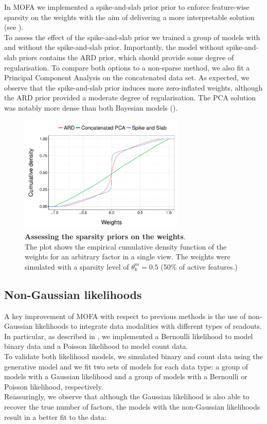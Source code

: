 In MOFA we implemented a spike-and-slab prior prior to enforce feature-wise sparsity on the weights with the aim of delivering a more interpretable solution (see ).\\
To assess the effect of the spike-and-slab prior we trained a group of models with and without the spike-and-slab prior. Importantly, the model without spike-and-slab priors contains the ARD prior, which should provide some degree of regularisation. To compare both options to a non-sparse method, we also fit a Principal Component Analysis on the concatenated data set. As expected, we observe that the spike-and-slab prior induces more zero-inflated weights, although the ARD prior provided a moderate degree of regularisation. The PCA solution was notably more dense than both Bayesian models ().

\begin{figure}[H]
	\centering 	
	\includegraphics[width=0.7\textwidth]{MOFA_sparsity}
	\caption{\textbf{Assessing the sparsity priors on the weights}.\\ 
	The plot shows the empirical cumulative density function of the weights for an arbitrary factor in a single view. The weights were simulated with a sparsity level of $\theta_k^m=0.5$ (50\% of active features.)
	}
	\label{fig:MOFA_sparsity}
\end{figure}


\subsection{Non-Gaussian likelihoods}  \label{section:mofa_nongaussian_results}

A key improvement of MOFA with respect to previous methods is the use of non-Gaussian likelihoods to integrate data modalities with different types of readouts. In particular, as described in , we implemented a Bernoulli likelihood to model binary data and a Poisson likelihood to model count data.\\
To validate both likelihood models, we simulated binary and count data using the generative model and we fit two sets of models for each data type: a group of models with a Gaussian likelihood and a group of models with a Bernoulli or Poisson likelihood, respectively.\\
Reassuringly, we observe that although the Gaussian likelihood is also able to recover the true number of factors, the models with the non-Gaussian likelihoods result in a better fit to the data:

